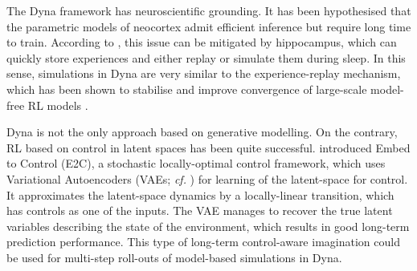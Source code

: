         The Dyna framework has neuroscientific grounding. It has been hypothesised that the parametric models of neocortex admit efficient inference but require long time to train. According to \cite{Kumaran2016}, this issue can be mitigated by hippocampus, which can quickly store experiences and either replay or simulate them during sleep. In this sense, simulations in Dyna are very similar to the experience-replay mechanism, which has been shown to stabilise and improve convergence of large-scale model-free RL models \citep{Mnih2015}.
        
        Dyna is not the only approach based on generative modelling. On the contrary, RL based on control in latent spaces has been quite successful. \cite{Watter2015} introduced Embed to Control (E2C), a stochastic locally-optimal control framework, which uses Variational Autoencoders (VAEs; \emph{cf.} ) for learning of the latent-space for control. It approximates the latent-space dynamics by a locally-linear transition, which has controls as one of the inputs. The VAE manages to recover the true latent variables describing the state of the environment, which results in good long-term prediction performance. This type of long-term control-aware imagination could be used for multi-step roll-outs of model-based simulations in Dyna.  

%
%   
